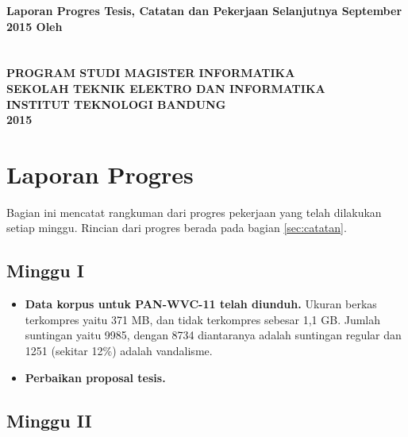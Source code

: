 



\thispagestyle{empty}
\begin{center}
	\textbf{%
		\mytitle
		\vfill
		Laporan Progres Tesis, Catatan dan Pekerjaan Selanjutnya
		\linebreak
		 September 2015
		\vfill
		Oleh \\
		\myname \\
		\mysid \\
		\vfill
		\uppercase{%
			Program Studi Magister Informatika \\
			Sekolah Teknik Elektro dan Informatika \\
			Institut Teknologi Bandung \\
			2015
		}
	}
\end{center}
\newpage

\section{Laporan Progres}

Bagian ini mencatat rangkuman dari progres pekerjaan yang telah dilakukan setiap minggu.
Rincian dari progres berada pada bagian \ref{sec:catatan}.

\subsection{Minggu I}

\begin{itemize}
	\item \textbf{Data korpus untuk PAN-WVC-11 telah diunduh.}
Ukuran berkas terkompres yaitu 371 MB, dan tidak terkompres sebesar 1,1 GB.
Jumlah suntingan yaitu 9985, dengan 8734 diantaranya adalah suntingan regular dan 1251 (sekitar 12\%) adalah vandalisme.

	\item \textbf{Perbaikan proposal tesis.}
\end{itemize}

\subsection{Minggu II}

